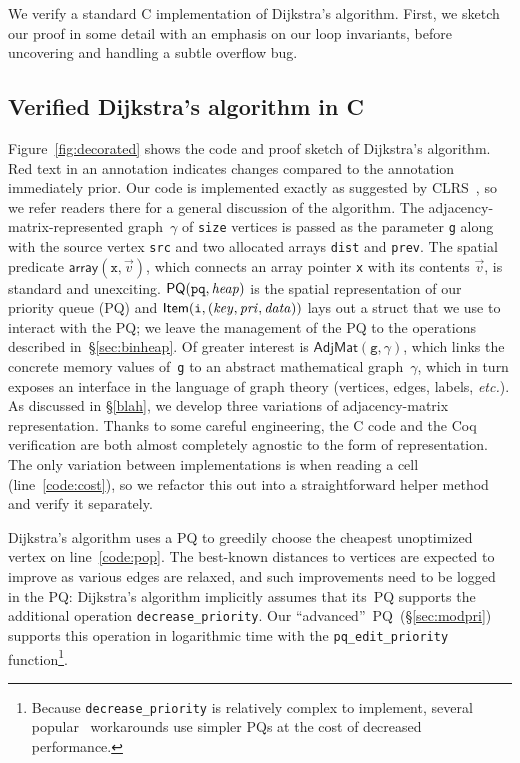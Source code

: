We verify a standard C implementation of Dijkstra's algorithm.
First, we sketch our proof in some detail with an emphasis on our loop invariants,
before uncovering and handling a subtle overflow bug.

\subsection{Verified Dijkstra's algorithm in C}
\label{sec:dijkoverview}

Figure~\ref{fig:decorated} shows the code and proof
sketch of Dijkstra's algorithm.
{\color{red}Red} text in an annotation indicates changes compared to the
annotation immediately prior.
Our code is implemented exactly
as suggested by CLRS~\cite{clrs}, so we refer readers there for a
general discussion of the algorithm.
The adjacency-matrix-represented graph~$\gamma$ of \texttt{size} vertices
is passed as the parameter \texttt{g} along with the source vertex \texttt{src}
and two allocated arrays \texttt{dist} and \texttt{prev}.
The spatial predicate $\mathsf{array}(\texttt{x},\vec{v})$, which connects
an array pointer \texttt{x} with its contents $\vec{v}$, is standard and unexciting.
$\mathsf{PQ}(\texttt{pq},\mathit{heap})$ is the spatial
representation of our priority queue (PQ) and
$\mathsf{Item}(\texttt{i},\mathit{(key, pri, data)})$
lays out a struct that we use to interact with the PQ;
we leave the management of the PQ to the operations described in~\S\ref{sec:binheap}.
Of greater interest is $\mathsf{AdjMat}(\texttt{g},\gamma)$, which
links the concrete memory values of~\texttt{g} to an abstract mathematical
graph~$\gamma$, which in turn exposes an interface in the
language of graph theory (vertices, edges, labels, \emph{etc.}).
As discussed in \S\ref{blah}, we develop three variations of
adjacency-matrix representation.
Thanks to some careful engineering, the C code and
the Coq verification are both almost completely agnostic to
the form of representation. The only variation between implementations
is when reading a cell (line~\ref{code:cost}), so we
refactor this out into a straightforward helper method and
verify it separately.





Dijkstra's algorithm uses a PQ to greedily choose the
cheapest unoptimized vertex on line~\ref{code:pop}. The
best-known distances to vertices are expected to improve as
various edges are relaxed, and such improvements need to be logged in the PQ:
Dijkstra's algorithm implicitly assumes that its~PQ supports the additional
operation \texttt{decrease\_priority}.
Our ``advanced''~PQ~(\S\ref{sec:modpri})
supports this operation in logarithmic time with the
\texttt{pq\_edit\_priority} function\footnote{Because
\texttt{decrease\_priority} is relatively complex to implement,
several popular~\cite{blah,blah,blah}
workarounds use simpler PQs at the cost
of decreased performance.}.

